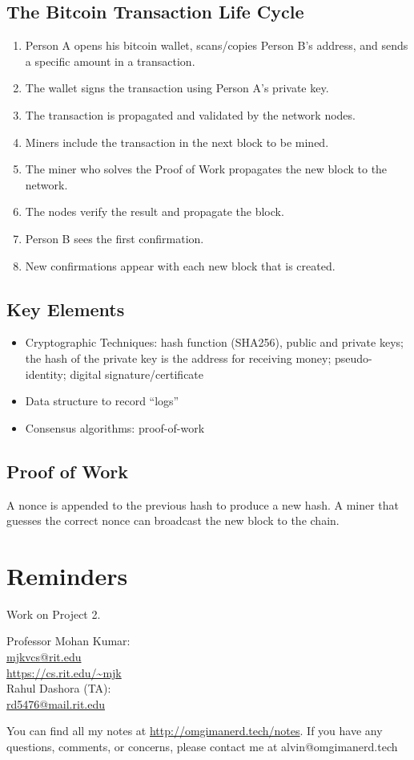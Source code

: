\documentclass{math}
\begin{document}
\subsection*{The Bitcoin Transaction Life Cycle}
\begin{enumerate}
  \item Person A opens his bitcoin wallet, scans/copies Person B's address,
  and sends a specific amount in a transaction.
  \item The wallet signs the transaction using Person A's private key.
  \item The transaction is propagated and validated by the network nodes.
  \item Miners include the transaction in the next block to be mined.
  \item The miner who solves the Proof of Work propagates the new block to the
  network.
  \item The nodes verify the result and propagate the block.
  \item Person B sees the first confirmation.
  \item New confirmations appear with each new block that is created.
\end{enumerate}

\subsection*{Key Elements}
\begin{itemize}
  \item Cryptographic Techniques: hash function (SHA256), public and private
  keys; the hash of the private key is the address for receiving money;
  pseudo-identity; digital signature/certificate
  \item Data structure to record ``logs''
  \item Consensus algorithms: proof-of-work
\end{itemize}

\subsection*{Proof of Work}
A nonce is appended to the previous hash to produce a new hash. A miner that
guesses the correct nonce can broadcast the new block to the chain.

\section*{Reminders}
Work on Project 2.

\noindent Professor Mohan Kumar: \\
\url{mjkvcs@rit.edu} \\
\url{https://cs.rit.edu/~mjk} \\

\noindent Rahul Dashora (TA): \\
\url{rd5476@mail.rit.edu} \\

\begin{center}
  You can find all my notes at \url{http://omgimanerd.tech/notes}. If you have
  any questions, comments, or concerns, please contact me at
  alvin@omgimanerd.tech
\end{center}
\end{document}
